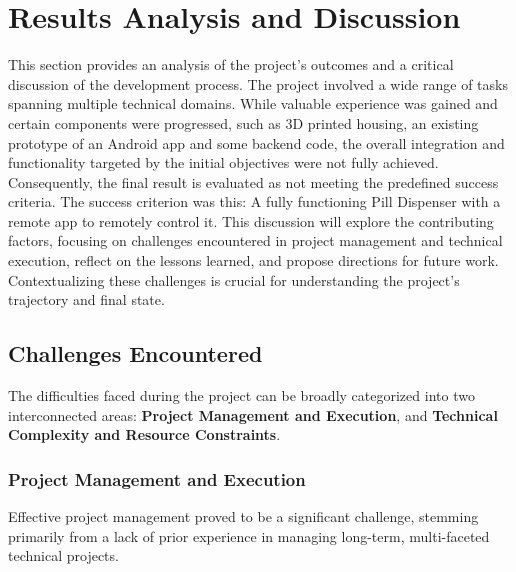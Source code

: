 \section{Results Analysis and Discussion}

This section provides an analysis of the project's outcomes and a critical discussion of the development process. The project involved a wide range of tasks spanning multiple technical domains. While valuable experience was gained and certain components were progressed, such as 3D printed housing, an existing prototype of an Android app and some backend code, the overall integration and functionality targeted by the initial objectives were not fully achieved. Consequently, the final result is evaluated as not meeting the predefined success criteria. The success criterion was this: A fully functioning Pill Dispenser with a remote app to remotely control it. This discussion will explore the contributing factors, focusing on challenges encountered in project management and technical execution, reflect on the lessons learned, and propose directions for future work. Contextualizing these challenges is crucial for understanding the project's trajectory and final state.

\subsection{Challenges Encountered}

The difficulties faced during the project can be broadly categorized into two interconnected areas: \textbf{Project Management and Execution}, and \textbf{Technical Complexity and Resource Constraints}.

\subsubsection{Project Management and Execution}

Effective project management proved to be a significant challenge, stemming primarily from a lack of prior experience in managing long-term, multi-faceted technical projects.

